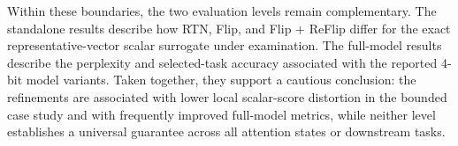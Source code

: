 \documentclass[../main.tex]{subfiles}
\begin{document}
Within these boundaries, the two evaluation levels remain complementary. The standalone results describe how RTN, Flip, and Flip + ReFlip differ for the exact representative-vector scalar surrogate under examination. The full-model results describe the perplexity and selected-task accuracy associated with the reported 4-bit model variants. Taken together, they support a cautious conclusion: the refinements are associated with lower local scalar-score distortion in the bounded case study and with frequently improved full-model metrics, while neither level establishes a universal guarantee across all attention states or downstream tasks.

\endgroup
\end{document}

